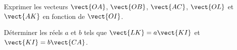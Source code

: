 
\begin{exercice}\label{exosmath-0686}

    Exprimer les vecteurs \( \vect{ OA }\), \( \vect{ OB }\), \( \vect{ AC }\), \( \vect{ OL }\) et \( \vect{ AK }\) en fonction de \( \vect{ OI }\).

\begin{center}
   
\end{center}

Déterminer les réels \( a\) et \( b\) tels que \( \vect{ LK }=a\vect{ KI }\) et \( \vect{ KI }=b\vect{ CA }\).

\end{exercice}
